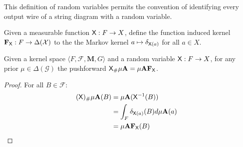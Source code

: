 This definition of random variables permits the convention of identifying every output wire of a string diagram with a random variable. 

\begin{definition}
Given a measurable function $\mathsf{X}:F\to X$, define the function induced kernel $\mathbf{F}_{\mathsf{X}}:F\to \Delta(\mathcal{X})$ to the the Markov kernel $a\mapsto \delta_{\mathsf{X}(a)}$ for all $a\in X$.
\end{definition}

\begin{lemma}\label{lem:pushf_funk}
Given a kernel space $\langle F,\mathcal{F},\mathbf{M}, G\rangle$ and a random variable $\mathsf{X}:F\to X$, for any prior $\mu\in \Delta(\mathcal{G})$ the pushforward $\mathsf{X}_\# \mu \mathbf{A} = \mu\mathbf{A} \mathbf{F}_{\mathsf{X}}$.
\end{lemma}

\begin{proof}
For all $B\in \mathcal{F}$:
\begin{align}
  (\mathsf{X})_\# \mu \mathbf{A} (B) &= \mu \mathbf{A} (\mathsf{X}^{-1}(B))\\
  								   &= \int_{F} \delta_{\mathsf{X}(a)} (B) d\mu\mathbf{A} (a)\\
  								   &= \mu\mathbf{A}\mathbf{F}_{\mathsf{X}}(B)
\end{align}
\end{proof}

